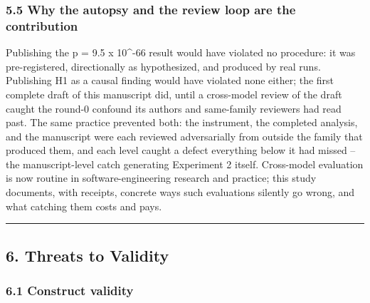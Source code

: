 \documentclass[
  11pt,
]{article}
\newcounter{none} %
\begin{document}
\subsubsection{5.5 Why the autopsy and the review loop are the
contribution}\label{why-the-autopsy-and-the-review-loop-are-the-contribution}

Publishing the p = 9.5 x 10\^{}-66 result would have violated no
procedure: it was pre-registered, directionally as hypothesized, and
produced by real runs. Publishing H1 as a causal finding would have
violated none either; the first complete draft of this manuscript did,
until a cross-model review of the draft caught the round-0 confound its
authors and same-family reviewers had read past. The same practice
prevented both: the instrument, the completed analysis, and the
manuscript were each reviewed adversarially from outside the family that
produced them, and each level caught a defect everything below it had
missed -- the manuscript-level catch generating Experiment 2 itself.
Cross-model evaluation is now routine in software-engineering research
and practice; this study documents, with receipts, concrete ways such
evaluations silently go wrong, and what catching them costs and pays.

\begin{center}\rule{0.5\linewidth}{0.5pt}\end{center}

\subsection{6. Threats to Validity}\label{threats-to-validity}

\subsubsection{6.1 Construct validity}\label{construct-validity}
\end{document}
